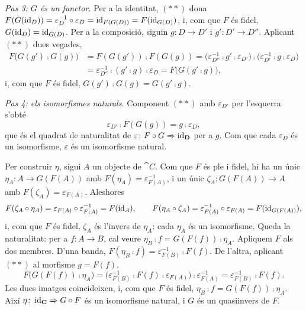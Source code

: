 \begin{prova}
\emph{Pas 3: $G$ és un functor.} Per a la identitat, $(\ast\ast)$ dona $F(G(\operatorname{id}_D))=\varepsilon_D^{-1}\circ\varepsilon_D=\operatorname{id}_{F(G(D))}=F(\operatorname{id}_{G(D)})$, i, com que $F$ és fidel, $G(\operatorname{id}_D)=\operatorname{id}_{G(D)}$. Per a la composició, siguin $g\colon D\to D'$ i $g'\colon D'\to D''$. Aplicant $(\ast\ast)$ dues vegades,
\[
\begin{aligned}
F\bigl(G(g')\comp G(g)\bigr)&=F(G(g'))\comp F(G(g))
=\bigl(\varepsilon_{D''}^{-1}\comp g'\comp\varepsilon_{D'}\bigr)\comp\bigl(\varepsilon_{D'}^{-1}\comp g\comp\varepsilon_D\bigr)\\
&=\varepsilon_{D''}^{-1}\comp(g'\comp g)\comp\varepsilon_D=F\bigl(G(g'\comp g)\bigr),
\end{aligned}
\]
i, com que $F$ és fidel, $G(g')\comp G(g)=G(g'\comp g)$.

\emph{Pas 4: els isomorfismes naturals.} Component $(\ast\ast)$ amb $\varepsilon_{D'}$ per l'esquerra s'obté
\[
\varepsilon_{D'}\comp F(G(g))=g\comp\varepsilon_D,
\]
que és el quadrat de naturalitat de $\varepsilon\colon F\circ G\Rightarrow\operatorname{id}_{\mathbf{D}}$ per a $g$. Com que cada $\varepsilon_D$ és un isomorfisme, $\varepsilon$ és un isomorfisme natural.

Per construir $\eta$, sigui $A$ un objecte de $\cat{C}$. Com que $F$ és ple i fidel, hi ha un únic $\eta_A\colon A\to G(F(A))$ amb $F(\eta_A)=\varepsilon_{F(A)}^{-1}$, i un únic $\zeta_A\colon G(F(A))\to A$ amb $F(\zeta_A)=\varepsilon_{F(A)}$. Aleshores
\[
F(\zeta_A\circ\eta_A)=\varepsilon_{F(A)}\circ\varepsilon_{F(A)}^{-1}=F(\operatorname{id}_A),
\qquad
F(\eta_A\circ\zeta_A)=\varepsilon_{F(A)}^{-1}\circ\varepsilon_{F(A)}=F(\operatorname{id}_{G(F(A))}),
\]
i, com que $F$ és fidel, $\zeta_A$ és l'invers de $\eta_A$: cada $\eta_A$ és un isomorfisme. Queda la naturalitat: per a $f\colon A\to B$, cal veure $\eta_B\comp f=G(F(f))\comp\eta_A$. Apliquem $F$ als dos membres. D'una banda, $F(\eta_B\comp f)=\varepsilon_{F(B)}^{-1}\comp F(f)$. De l'altra, aplicant $(\ast\ast)$ al morfisme $g=F(f)$,
\[
F\bigl(G(F(f))\comp\eta_A\bigr)=\bigl(\varepsilon_{F(B)}^{-1}\comp F(f)\comp\varepsilon_{F(A)}\bigr)\comp\varepsilon_{F(A)}^{-1}=\varepsilon_{F(B)}^{-1}\comp F(f).
\]
Les dues imatges coincideixen, i, com que $F$ és fidel, $\eta_B\comp f=G(F(f))\comp\eta_A$. Així $\eta\colon\operatorname{id}_{\mathbf{C}}\Rightarrow G\circ F$ és un isomorfisme natural, i $G$ és un quasiinvers de $F$.
\end{prova}

